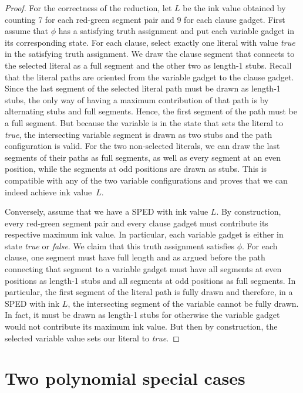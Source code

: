 \documentclass[a4paper, USenglish]{llncs}
\begin{document}
\begin{proof}
		For the correctness of the reduction, let $L$ be the ink value obtained by counting 7 for each red-green segment pair and 9 for each clause gadget. 
		First assume that $\phi$ has a satisfying truth assignment and put each variable gadget in its corresponding state.
		For each clause, select exactly one literal with value \emph{true} in the satisfying truth assignment. 
		We draw the clause segment that connects to the selected literal as a full segment and the other two as length-1 stubs.
		Recall that the literal paths are oriented from the variable gadget to the clause gadget.
		Since the last segment of the selected literal path must be drawn as length-1 stubs, the only way of having a maximum contribution of that path is by alternating stubs and full segments.
		Hence, the first segment of the path must be a full segment.
		But because the variable is in the state that sets the literal to \emph{true}, the intersecting variable segment is drawn as two stubs and the path configuration is valid.
		For the two non-selected literals, we can draw the last segments of their paths as full segments, as well as every segment at an even position, while the segments at odd positions are drawn as stubs. 
		This is compatible with any of the two variable configurations and proves that we can indeed achieve ink value~$L$.
		
		Conversely, assume that we have a SPED with ink value $L$. 
		By construction, every red-green segment pair and every clause gadget must contribute its respective maximum ink value.
		In particular, each variable gadget is either in state \emph{true} or \emph{false}.
		We claim that this truth assignment satisfies $\phi$.
		For each clause, one segment must have full length and as argued before the path connecting that segment to a variable gadget must have all segments at even positions as length-1 stubs and all segments at odd positions as full segments. 
		In particular, the first segment of the literal path is fully drawn and therefore, in a SPED with ink $L$, the intersecting segment of the variable cannot be fully drawn.
		In fact, it must be drawn as length-1 stubs for otherwise the variable gadget would not contribute its maximum ink value.
		But then by construction, the selected variable value sets our literal to \emph{true}.	
	\end{proof}
	
	\section{Two polynomial special cases}
	
\end{document}
